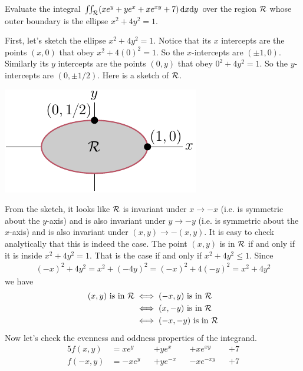\begin{eg}\label{eg_odd_integralB}
Evaluate the integral $\iint_{\mathcal{R}}(xe^y + ye^x + xe^{xy} + 7)\,\mathrm{d}x\mathrm{d}y$ 
over the region $\mathcal{R}$ whose outer boundary is the ellipse $x^2+4y^2=1$.

\soln
First, let's sketch the ellipse $x^2+4y^2=1$. Notice that its $x$ intercepts
are the points $(x,0)$ that obey $x^2+4(0)^2=1$. So the $x$-intercepts are
$(\pm 1,0)$. Similarly its $y$ intercepts
are the points $(0,y)$ that obey $0^2+4y^2=1$. So the $y$-intercepts are
$(0,\pm 1/2)$. Here is a sketch of $\mathcal{R}$.
\begin{efig}
\begin{center}
   \includegraphics{ellipticalDomain.pdf}
\end{center}
\end{efig}
From the sketch, it looks like $\mathcal{R}$ is invariant under $x\rightarrow-x$
(i.e. is symmetric about the $y$-axis) and is also invariant under $y\rightarrow-y$ (i.e. is symmetric about the $x$-axis) and is also 
invariant under $(x,y)\rightarrow-(x,y)$. It is easy to check analytically that 
this is indeed the case. The point $(x,y)$ is in $\mathcal{R}$ if and only if it is inside $x^2+4y^2=1$. That is the case if and only if $x^2+4y^2\le 1$.
Since
\begin{align*}
(-x)^2+4y^2 = x^2+(-4y)^2 = (-x)^2+4(-y)^2 = x^2+4y^2
\end{align*}
we have
\begin{align*}
(x,y)\text{ is in $\mathcal{R}$} &\iff (-x,y)\text{ is in $\mathcal{R}$} \\
                         &\iff (x,-y)\text{ is in $\mathcal{R}$} \\
                         &\iff (-x,-y)\text{ is in $\mathcal{R}$} 
\end{align*}
Now let's check the evenness and oddness properties of the integrand.
\begin{alignat*}{5}
f(x,y) &= xe^y &&+ ye^x &&+ xe^{xy} &&+ 7 \\
f(-x,y) &= -xe^y &&+ ye^{-x} &&- xe^{-xy} &&+ 7 \\

\end{alignat*}
\end{eg}
